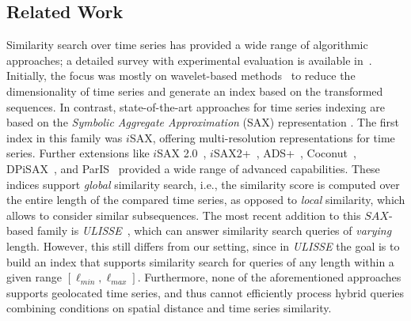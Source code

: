 \subsection{Related Work}
\label{sec:related}


Similarity search over time series has provided a wide range of algorithmic approaches; a detailed survey with experimental evaluation is available in~\cite{DBLP:journals/pvldb/EchihabiZPB18}. Initially, the focus was mostly on wavelet-based methods~\cite{chan1999icde} to reduce the dimensionality of time series and generate an index based on the transformed sequences. In contrast, state-of-the-art approaches for time series indexing are based on the {\em Symbolic Aggregate Approximation} (SAX) representation \cite{jessica2007dmkd}. The first index in this family was $i$SAX\cite{shieh2008kdd}, offering multi-resolution representations for time series. Further extensions like $i$SAX 2.0~\cite{camerra2010icdm}, $i$SAX2+~\cite{camerra2014kais}, ADS+~\cite{zoumpatianos2014sigmod}, Coconut~\cite{DBLP:journals/pvldb/KondylakisDZP18}, DPiSAX~\cite{dpisaxjournal}, and ParIS~\cite{DBLP:conf/bigdataconf/PengFP18} provided a wide range of advanced capabilities. These indices support {\em global} similarity search, i.e., the similarity score is computed over the entire length of the compared time series, as opposed to {\em local} similarity, which allows to consider similar subsequences. The most recent addition to this $SAX$-based family is \textit{ULISSE}~\cite{linardi2018scalable}, which can answer similarity search queries of {\em varying} length. However, this still differs from our setting, since in \textit{ULISSE} the goal is to build an index that supports similarity search for queries of any length within a given range $[\ell_{min}, \ell_{max}]$. Furthermore, none of the aforementioned approaches supports geolocated time series, and thus cannot efficiently process hybrid queries combining conditions on spatial distance and time series similarity.




